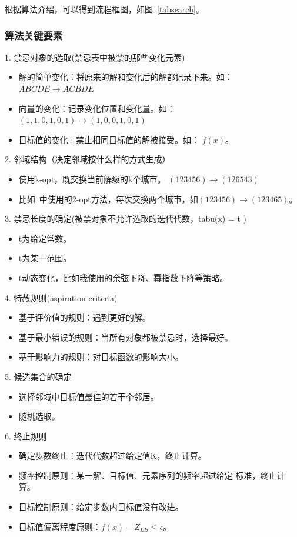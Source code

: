 \documentclass[lang=cn,11pt]{elegantpaper}
\begin{document}
根据算法介绍，可以得到流程框图，如图~\ref{tabsearch}。

\subsubsection{算法关键要素}
1. 禁忌对象的选取(禁忌表中被禁的那些变化元素)

        \begin{itemize}[leftmargin=50pt]
        \item 解的简单变化：将原来的解和变化后的解都记录下来。如：$ABCDE \rightarrow ACBDE  $
        \item 向量的变化：记录变化位置和变化量。如：
            $(1,1,0,1,0,1) \rightarrow (1,0,0,1,0,1)    $
        \item 目标值的变化 : 禁止相同目标值的解被接受。如：
            $f(x)$。
        \end{itemize}

2. 邻域结构（决定邻域按什么样的方式生成）
        \begin{itemize}[leftmargin=50pt]
        \item 使用k-opt，既交换当前解级的k个城市。
            $(123456) \rightarrow (126543)    $
        \item 比如~\cite{2opt}中使用的2-opt方法，每次交换两个城市，如$(123456) \rightarrow (123465)    $。
        \end{itemize}

3. 禁忌长度的确定(被禁对象不允许选取的迭代代数，tabu(x) = t )
        \begin{itemize}[leftmargin=50pt]
        \item t为给定常数。
        \item t为某一范围。
        \item t动态变化，比如我使用的余弦下降、幂指数下降等策略。
        \end{itemize}
4. 特赦规则(aspiration criteria)
        \begin{itemize}[leftmargin=50pt]
        \item 基于评价值的规则：遇到更好的解。
        \item 基于最小错误的规则：当所有对象都被禁忌时，选择最好。
        \item 基于影响力的规则：对目标函数的影响大小。
        \end{itemize}
5. 候选集合的确定
        \begin{itemize}[leftmargin=50pt]
        \item 选择邻域中目标值最佳的若干个邻居。
        \item 随机选取。
        \end{itemize}
6. 终止规则
        \begin{itemize}[leftmargin=50pt]
        \item 确定步数终止：迭代代数超过给定值K，终止计算。
        \item 频率控制原则：某一解、目标值、元素序列的频率超过给定                                   标准，终止计算。
        \item 目标控制原则：给定步数内目标值没有改进。
        \item 目标值偏离程度原则：$f(x) - Z_{LB} \leq \epsilon$。
        \end{itemize}
\end{document}
